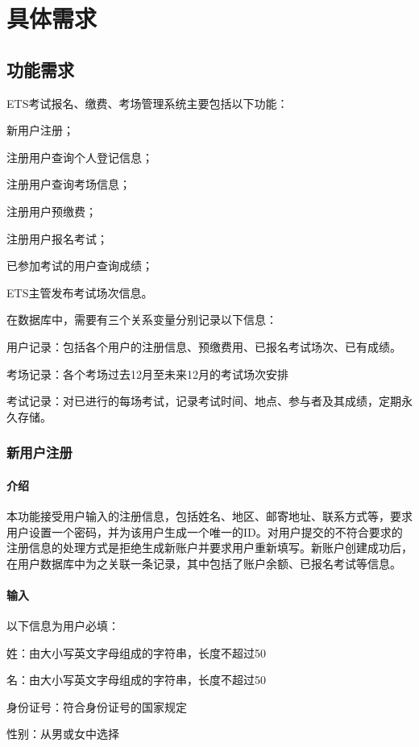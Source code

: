 \chapter{具体需求}

\section{功能需求}
ETS考试报名、缴费、考场管理系统主要包括以下功能：

	新用户注册；

	注册用户查询个人登记信息；

	注册用户查询考场信息；

	注册用户预缴费；

	注册用户报名考试；

	已参加考试的用户查询成绩；

	ETS主管发布考试场次信息。

在数据库中，需要有三个关系变量分别记录以下信息：

	用户记录：包括各个用户的注册信息、预缴费用、已报名考试场次、已有成绩。

	考场记录：各个考场过去12月至未来12月的考试场次安排

	考试记录：对已进行的每场考试，记录考试时间、地点、参与者及其成绩，定期永久存储。


\subsection{新用户注册}

\subsubsection{介绍}
本功能接受用户输入的注册信息，包括姓名、地区、邮寄地址、联系方式等，要求用户设置一个密码，并为该用户生成一个唯一的ID。对用户提交的不符合要求的注册信息的处理方式是拒绝生成新账户并要求用户重新填写。新账户创建成功后，在用户数据库中为之关联一条记录，其中包括了账户余额、已报名考试等信息。

\subsubsection{输入}
以下信息为用户必填：

	姓：由大小写英文字母组成的字符串，长度不超过50

	名：由大小写英文字母组成的字符串，长度不超过50

	身份证号：符合身份证号的国家规定

	性别：从男或女中选择

